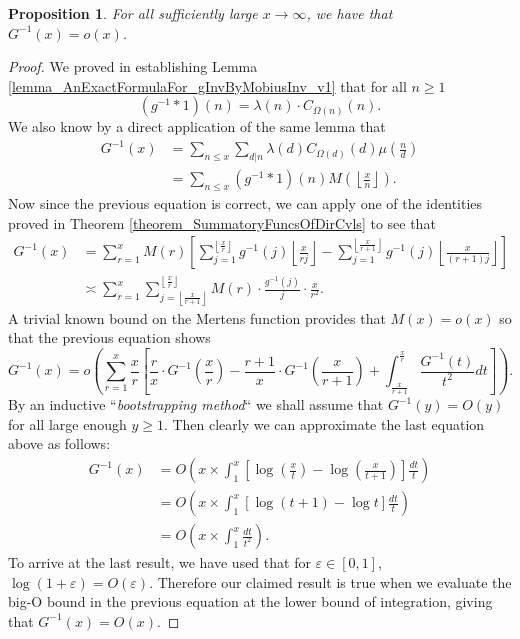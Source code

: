 \documentclass[11pt,reqno,a4letter]{article}
\numberwithin{figure}{section}
\numberwithin{table}{section}
\newcommand{\Floor}[2]{\ensuremath{\left\lfloor \frac{#1}{#2} \right\rfloor}}
\theoremstyle{plain}
\newtheorem{prop}[theorem]{Proposition}
\numberwithin{theorem}{section}
\theoremstyle{definition}
\begin{document}
\begin{prop} 
\label{prop_GInvx_EQ_BigOOfx_v1} 
For all sufficiently large $x \rightarrow \infty$, we have that 
$G^{-1}(x) = o(x)$. 
\end{prop} 
\begin{proof} 
We proved in establishing 
Lemma \ref{lemma_AnExactFormulaFor_gInvByMobiusInv_v1} 
that for all $n \geq 1$ 
$$(g^{-1} \ast 1)(n) = \lambda(n) \cdot C_{\Omega(n)}(n).$$ 
We also know by a direct application of the same lemma that 
\begin{align*} 
G^{-1}(x) & = \sum_{n \leq x} \sum_{d|n} \lambda(d) C_{\Omega(d)}(d) \mu\left(\frac{n}{d}\right) \\ 
     & = \sum_{n \leq x} (g^{-1} \ast 1)(n) M\left(\Floor{x}{n}\right). 
\end{align*} 
Now since the previous equation is correct, we can apply one of the identities proved in 
Theorem \ref{theorem_SummatoryFuncsOfDirCvls} to see that 
\begin{align*}
G^{-1}(x) & = \sum_{r=1}^{x} M(r) \left[\sum_{j=1}^{\Floor{x}{r}} g^{-1}(j) \Floor{x}{rj} - 
     \sum_{j=1}^{\Floor{x}{r+1}} g^{-1}(j) \Floor{x}{(r+1)j}
     \right] \\ 
     & \asymp \sum_{r=1}^{x} \sum_{j=\Floor{x}{r+1}}^{\Floor{x}{r}} M(r) \cdot 
     \frac{g^{-1}(j)}{j} \cdot \frac{x}{r^2}. 
\end{align*} 
A trivial known bound on the Mertens function provides that $M(x) = o(x)$ so that the 
previous equation shows 
\[
G^{-1}(x) = o\left(\sum_{r=1}^{x} \frac{x}{r} \left[
     \frac{r}{x} \cdot G^{-1}\left(\frac{x}{r}\right) - 
     \frac{r+1}{x} \cdot G^{-1}\left(\frac{x}{r+1}\right) 
     + \int_{\frac{x}{r+1}}^{\frac{x}{r}} \frac{G^{-1}(t)}{t^2} dt 
     \right]\right). 
\]
By an inductive ``\emph{bootstrapping method}`` we shall assume that 
$G^{-1}(y) = O(y)$ for all large enough $y \geq 1$. 
Then clearly we can approximate the last equation above as follows: 
\begin{align*} 
G^{-1}(x) & = O\left(x \times \int_{1}^{x} \left[
     \log\left(\frac{x}{t}\right) - \log\left(\frac{x}{t+1}\right) 
     \right] \frac{dt}{t}\right) \\ 
     & = O\left(x \times \int_{1}^{x} \left[\log(t+1) - \log t\right] \frac{dt}{t}\right) \\ 
     & = O\left(x \times \int_{1}^{x} \frac{dt}{t^2}\right). 
\end{align*} 
To arrive at the last result, we have used that for $\varepsilon \in [0, 1]$, 
$\log(1 + \varepsilon) = O(\varepsilon)$. 
Therefore our claimed result is true when we evaluate the big-O bound in the previous equation 
at the lower bound of integration, giving that $G^{-1}(x) = O(x)$. 
\end{proof} 
\end{document}
